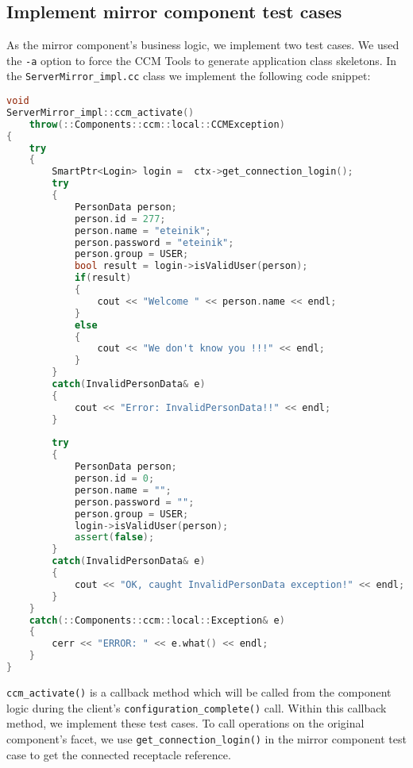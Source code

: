 \subsection{Implement mirror component test cases}
\label{subsection:ImplementMirrorComponentTestCasesCxx}
As the mirror component's business logic, we implement two test cases.
We used the {\tt -a} option to force the CCM Tools to generate application class
skeletons.
In the {\tt ServerMirror\_impl.cc} class we implement the following code snippet:
\begin{footnotesize}
\begin{lstlisting}[language=C++]
void
ServerMirror_impl::ccm_activate()
    throw(::Components::ccm::local::CCMException)
{
    try
    {
        SmartPtr<Login> login =  ctx->get_connection_login();
        try 
        {
            PersonData person;
            person.id = 277;
            person.name = "eteinik";
            person.password = "eteinik";
            person.group = USER;
            bool result = login->isValidUser(person);
            if(result) 
            {
                cout << "Welcome " << person.name << endl;
            }
            else 
            {
                cout << "We don't know you !!!" << endl;
            }
        }
        catch(InvalidPersonData& e) 
        {
            cout << "Error: InvalidPersonData!!" << endl;
        }
        
        try 
        {
            PersonData person;
            person.id = 0;
            person.name = "";
            person.password = "";
            person.group = USER;      
            login->isValidUser(person);
            assert(false);
        }
        catch(InvalidPersonData& e) 
        {
            cout << "OK, caught InvalidPersonData exception!" << endl;
        }
    }
    catch(::Components::ccm::local::Exception& e)
    {
        cerr << "ERROR: " << e.what() << endl;
    }
}
\end{lstlisting} 
\end{footnotesize}

{\tt ccm\_activate()} is a callback method which will be called from the component 
logic during the client's {\tt configuration\_complete()} call.
Within this callback method, we implement these test cases. 
To call operations on the original component's facet, we use {\tt get\_connection\_login()} 
in the mirror component test case to get the connected receptacle reference. 

